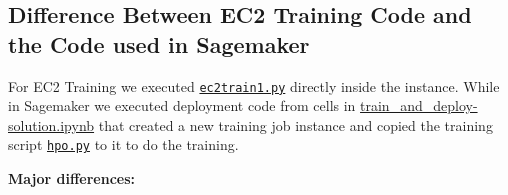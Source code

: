 \documentclass[a4paper
]{article}
\begin{document}
\newpage
\hypertarget{difference-between-ec2-training-code-and-the-code-used-in-sagemaker}{%
\subsection{Difference Between EC2 Training Code and the Code used in
Sagemaker}\label{difference-between-ec2-training-code-and-the-code-used-in-sagemaker}}

For EC2 Training we executed \href{https://github.com/FadyMorris/udacity-AWS-ml-engineer-nanodegree/tree/main/projects/04_operationalizing-an-aws-ml-project/ec2train1.py}{\texttt{ec2train1.py}}
directly inside the instance. While in Sagemaker we executed deployment
code from cells in \url{train_and_deploy-solution.ipynb} that created a
new training job instance and copied the training script
\href{https://github.com/FadyMorris/udacity-AWS-ml-engineer-nanodegree/tree/main/projects/04_operationalizing-an-aws-ml-project/hpo.py}{\texttt{hpo.py}} to it to do the training.

\textbf{Major differences:}
\end{document}
